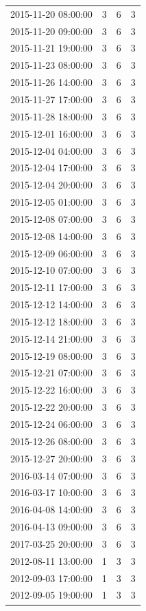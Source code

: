 \begin{tabular}{lrrr}
2015-11-20 08:00:00 & 3 & 6 & 3 \\
2015-11-20 09:00:00 & 3 & 6 & 3 \\
2015-11-21 19:00:00 & 3 & 6 & 3 \\
2015-11-23 08:00:00 & 3 & 6 & 3 \\
2015-11-26 14:00:00 & 3 & 6 & 3 \\
2015-11-27 17:00:00 & 3 & 6 & 3 \\
2015-11-28 18:00:00 & 3 & 6 & 3 \\
2015-12-01 16:00:00 & 3 & 6 & 3 \\
2015-12-04 04:00:00 & 3 & 6 & 3 \\
2015-12-04 17:00:00 & 3 & 6 & 3 \\
2015-12-04 20:00:00 & 3 & 6 & 3 \\
2015-12-05 01:00:00 & 3 & 6 & 3 \\
2015-12-08 07:00:00 & 3 & 6 & 3 \\
2015-12-08 14:00:00 & 3 & 6 & 3 \\
2015-12-09 06:00:00 & 3 & 6 & 3 \\
2015-12-10 07:00:00 & 3 & 6 & 3 \\
2015-12-11 17:00:00 & 3 & 6 & 3 \\
2015-12-12 14:00:00 & 3 & 6 & 3 \\
2015-12-12 18:00:00 & 3 & 6 & 3 \\
2015-12-14 21:00:00 & 3 & 6 & 3 \\
2015-12-19 08:00:00 & 3 & 6 & 3 \\
2015-12-21 07:00:00 & 3 & 6 & 3 \\
2015-12-22 16:00:00 & 3 & 6 & 3 \\
2015-12-22 20:00:00 & 3 & 6 & 3 \\
2015-12-24 06:00:00 & 3 & 6 & 3 \\
2015-12-26 08:00:00 & 3 & 6 & 3 \\
2015-12-27 20:00:00 & 3 & 6 & 3 \\
2016-03-14 07:00:00 & 3 & 6 & 3 \\
2016-03-17 10:00:00 & 3 & 6 & 3 \\
2016-04-08 14:00:00 & 3 & 6 & 3 \\
2016-04-13 09:00:00 & 3 & 6 & 3 \\
2017-03-25 20:00:00 & 3 & 6 & 3 \\
2012-08-11 13:00:00 & 1 & 3 & 3 \\
2012-09-03 17:00:00 & 1 & 3 & 3 \\
2012-09-05 19:00:00 & 1 & 3 & 3 \\

\end{tabular}
